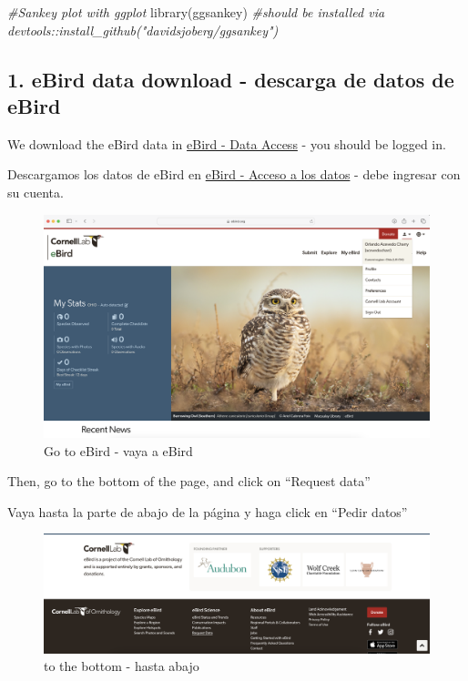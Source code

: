 \documentclass[
]{article}
\newenvironment{Shaded}{\begin{snugshade}}{\end{snugshade}}
\newcommand{\CommentTok}[1]{\textcolor[rgb]{0.56,0.35,0.01}{\textit{#1}}}
\newcommand{\FunctionTok}[1]{\textcolor[rgb]{0.00,0.00,0.00}{#1}}
\newcommand{\NormalTok}[1]{#1}
\begin{document}
\begin{Shaded}
\begin{Highlighting}[]
\CommentTok{\#Sankey plot with ggplot}
\FunctionTok{library}\NormalTok{(ggsankey) }\CommentTok{\#should be installed via \textasciigrave{}devtools::install\_github("davidsjoberg/ggsankey")\textasciigrave{}}
\end{Highlighting}
\end{Shaded}

\hypertarget{ebird-data-download---descarga-de-datos-de-ebird}{%
\subsection{1. eBird data download - descarga de datos de
eBird}\label{ebird-data-download---descarga-de-datos-de-ebird}}

We download the eBird data in
\href{https://ebird.org/data/download}{eBird - Data Access} - you should
be logged in.

Descargamos los datos de eBird en
\href{https://ebird.org/data/download}{eBird - Acceso a los datos} -
debe ingresar con su cuenta.

\begin{figure}
\centering
\includegraphics{screenshots/eBird1.png}
\caption{Go to eBird - vaya a eBird}
\end{figure}

Then, go to the bottom of the page, and click on ``Request data''

Vaya hasta la parte de abajo de la página y haga click en ``Pedir
datos''

\begin{figure}
\centering
\includegraphics{screenshots/eBird2.png}
\caption{to the bottom - hasta abajo}
\end{figure}
\end{document}
